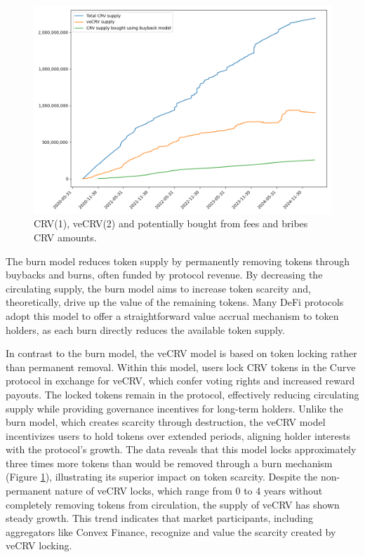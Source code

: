 \documentclass[notitlepage]{revtex4-2}
\begin{document}
\begin{figure}[ht]
    \centering
    \includegraphics[width=\linewidth]{images/CRV_burn_model}
    \caption{CRV(1), veCRV(2) and potentially bought from fees and bribes CRV amounts.}
    \label{fig:vecrv}
\end{figure}

The burn model reduces token supply by permanently removing tokens through buybacks and burns, often funded by protocol
revenue. By decreasing the circulating supply, the burn model aims to increase token scarcity and, theoretically,
drive up the value of the remaining tokens. Many DeFi protocols adopt this model to offer a straightforward value
accrual mechanism to token holders, as each burn directly reduces the available token supply.

In contrast to the burn model, the veCRV model is based on token locking rather than permanent removal. Within this
model, users lock CRV tokens in the Curve protocol in exchange for veCRV, which confer voting rights and increased
reward payouts. The locked tokens remain in the protocol, effectively reducing circulating supply while providing
governance incentives for long-term holders. Unlike the burn model, which creates scarcity through destruction,
the veCRV model incentivizes users to hold tokens over extended periods, aligning holder interests with the protocol’s
growth. The data reveals that this model locks approximately three times more tokens than would be removed through
a burn mechanism (Figure \ref{fig:vecrv}), illustrating its superior impact on token scarcity. Despite the
non-permanent nature of veCRV locks, which range from 0 to 4 years without completely removing tokens from circulation,
the supply of veCRV has shown steady growth. This trend indicates that market participants, including aggregators like
Convex Finance, recognize and value the scarcity created by veCRV locking.
\end{document}
